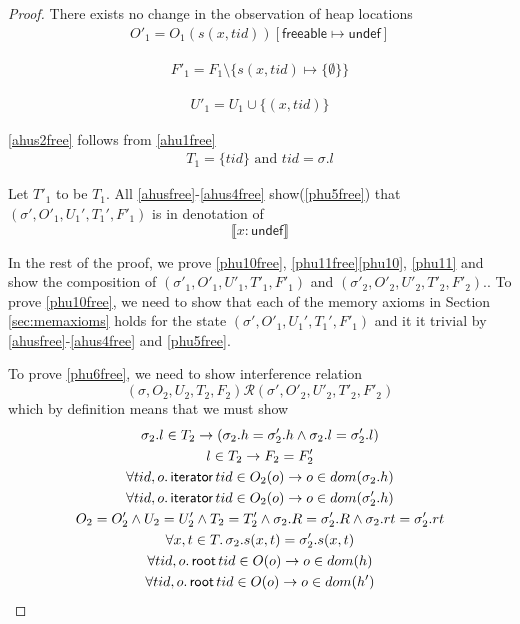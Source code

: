 \begin{proof}
There exists no change in the observation of heap locations
\begin{gather}\label{ahus1free}
  O'_1 =  O_1(s(x,tid))[\textsf{freeable}\mapsto \textsf{undef}]
\end{gather}

\begin{gather}\label{ahus3free}
  F'_1 = F_1 \setminus \{s(x,tid)\mapsto \{\emptyset\}\}
  \end{gather}

\begin{gather}\label{ahus4free}
  U'_1 = U_1 \cup \{(x,tid)\}
  \end{gather}

\ref{ahus2free} follows from \ref{ahu1free}
\begin{gather}\label{ahus2free}
  T_1 = \{tid\} \text{ and } tid = \sigma.l
\end{gather}

Let $T'_1$ to be $T_1$. All \ref{ahusfree}-\ref{ahus4free} show(\ref{phu5free}) that $(\sigma',O'_1,U_1',T_1',F'_1)$ is in denotation of  
\[\llbracket  x:\textsf{undef}  \rrbracket \]

In the rest of the proof, we prove \ref{phu10free}, \ref{phu11free}\ref{phu10}, \ref{phu11} and show the composition of $(\sigma'_1, O'_1, U'_1,T'_1,F'_1)$ and  $(\sigma'_2, O'_2, U'_2,T'_2,F'_2)$.. To prove \ref{phu10free}, we need to show that each of the memory axioms in Section \ref{sec:memaxioms} holds for the state $(\sigma',O'_1,U_1',T_1',F'_1)$ and it it trivial by \ref{ahusfree}-\ref{ahus4free} and \ref{phu5free}.

To prove \ref{phu6free}, we need to show interference relation
\[(\sigma, O_2, U_2, T_2,F_2) \mathcal{R} (\sigma', O'_2, U'_2, T'_2,F'_2)  \]
which by definition means that we must show 
\begin{gather}\label{phu17free}
  \sigma_2.l  \in  T_2 \rightarrow (\sigma_2.h =\sigma'_2.h \land \sigma_2.l=\sigma'_2.l)\\
  \label{phu18free}
  l\in T_2\rightarrow F_2=F_2'\\
  \label{phu20free}
  \forall tid,o\ldotp\textsf{iterator} \, tid \in O_2(o) \rightarrow o \in dom(\sigma_2.h) \\
  \label{phu21free}
  \forall tid,o\ldotp\textsf{iterator} \, tid \in O_2(o) \rightarrow o \in dom(\sigma'_2.h) \\
  \label{phu22free}
  O_2 = O_2' \land U_2 = U_2' \land T_2 = T_2'\land \sigma_2.R = \sigma'_2.R \land \sigma_2.rt = \sigma'_2.rt \\
  \label{phu23free}
  \forall x, t \in T \ldotp \sigma_2.s(x,t) = \sigma'_2.s(x,t) \\
    \label{phufreert1}
  \forall tid,o\ldotp\textsf{root} \, tid \in O(o) \rightarrow o \in dom(h) \\
  \label{phufreert2}
  \forall tid,o\ldotp\textsf{root} \, tid \in O(o) \rightarrow o \in dom(h') 
\end{gather}


\end{proof}
